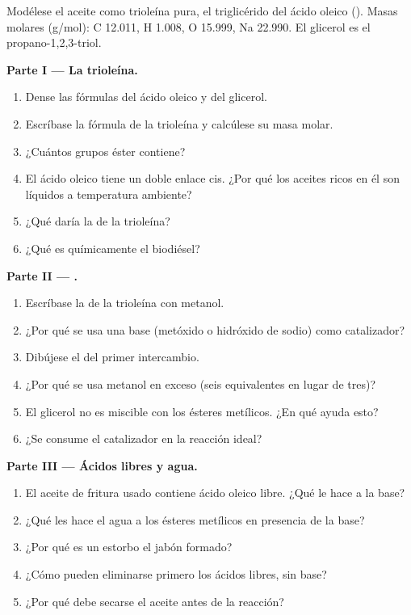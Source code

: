 \begin{problem}
\label{pb:b2:acyl-substitution:1}
Modélese el aceite como trioleína pura, el triglicérido del ácido oleico (). Masas molares
(\unit{g/mol}): C 12.011, H 1.008, O 15.999, Na 22.990. El glicerol es el propano-1,2,3-triol.

\medskip
\noindent\textbf{Parte I --- La trioleína.}
\begin{enumerate}
  \item Dense las fórmulas del ácido oleico y del glicerol.
  \item Escríbase la fórmula de la trioleína y calcúlese su masa molar.
  \item ¿Cuántos grupos éster contiene?
  \item El ácido oleico tiene un doble enlace cis. ¿Por qué los aceites ricos en él son líquidos a temperatura ambiente?
  \item ¿Qué daría la  de la trioleína?
  \item ¿Qué es químicamente el biodiésel?
\end{enumerate}

\medskip
\noindent\textbf{Parte II --- .}
\begin{enumerate}[resume]
  \item Escríbase la  de la trioleína con metanol.
  \item ¿Por qué se usa una base (metóxido o hidróxido de sodio) como catalizador?
  \item Dibújese el  del primer intercambio.
  \item ¿Por qué se usa metanol en exceso (seis equivalentes en lugar de tres)?
  \item El glicerol no es miscible con los ésteres metílicos. ¿En qué ayuda esto?
  \item ¿Se consume el catalizador en la reacción ideal?
\end{enumerate}

\medskip
\noindent\textbf{Parte III --- Ácidos libres y agua.}
\begin{enumerate}[resume]
  \item El aceite de fritura usado contiene ácido oleico libre. ¿Qué le hace a la base?
  \item ¿Qué les hace el agua a los ésteres metílicos en presencia de la base?
  \item ¿Por qué es un estorbo el jabón formado?
  \item ¿Cómo pueden eliminarse primero los ácidos libres, sin base?
  \item ¿Por qué debe secarse el aceite antes de la reacción?
\end{enumerate}


\end{problem}
